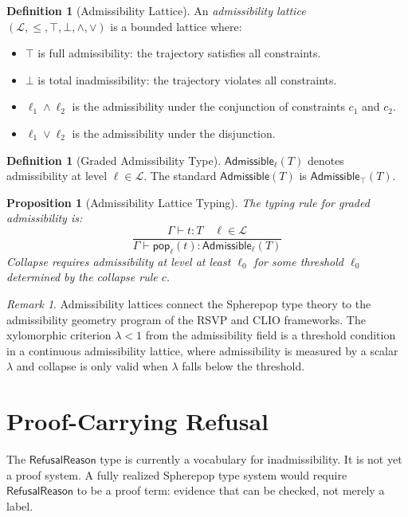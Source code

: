 \documentclass[12pt, a4paper, openany]{book}
\theoremstyle{plain}
\newtheorem{proposition}[theorem]{Proposition}
\theoremstyle{definition}
\newtheorem{definition}[theorem]{Definition}
\theoremstyle{remark}
\newtheorem{remark}[theorem]{Remark}
\newcommand{\Adm}{\mathsf{Admissible}}
\begin{document}
\begin{definition}[Admissibility Lattice]
An \emph{admissibility lattice} $(\mathcal{L}, \leq, \top, \bot, \wedge, \vee)$
is a bounded lattice where:
\begin{itemize}
\item $\top$ is full admissibility: the trajectory satisfies all constraints.
\item $\bot$ is total inadmissibility: the trajectory violates all constraints.
\item $\ell_1 \wedge \ell_2$ is the admissibility under the conjunction of
constraints $c_1$ and $c_2$.
\item $\ell_1 \vee \ell_2$ is the admissibility under the disjunction.
\end{itemize}
\end{definition}

\begin{definition}[Graded Admissibility Type]
$\Adm_\ell(T)$ denotes admissibility at level $\ell \in \mathcal{L}$. The
standard $\Adm(T)$ is $\Adm_\top(T)$.
\end{definition}

\begin{proposition}[Admissibility Lattice Typing]
The typing rule for graded admissibility is:
\[
\frac{\Gamma \vdash t : T \quad \ell \in \mathcal{L}}{\Gamma \vdash \mathsf{pop}_\ell(t) : \Adm_\ell(T)}
\]
Collapse requires admissibility at level at least $\ell_0$ for some threshold
$\ell_0$ determined by the collapse rule $c$.
\end{proposition}

\begin{remark}
Admissibility lattices connect the Spherepop type theory to the admissibility
geometry program of the RSVP and CLIO frameworks. The xylomorphic criterion
$\lambda < 1$ from the admissibility field is a threshold condition in a
continuous admissibility lattice, where admissibility is measured by a scalar
$\lambda$ and collapse is only valid when $\lambda$ falls below the threshold.
\end{remark}

\section{Proof-Carrying Refusal}

The $\mathsf{RefusalReason}$ type is currently a vocabulary for inadmissibility.
It is not yet a proof system. A fully realized Spherepop type system would require
$\mathsf{RefusalReason}$ to be a proof term: evidence that can be checked, not
merely a label.
\end{document}
